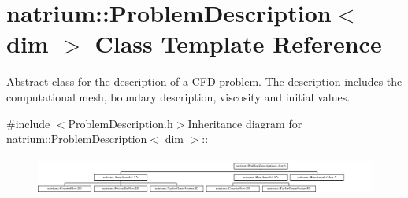 \hypertarget{classnatrium_1_1ProblemDescription}{
\section{natrium::ProblemDescription$<$ dim $>$ Class Template Reference}
\label{classnatrium_1_1ProblemDescription}
}


Abstract class for the description of a CFD problem. The description includes the computational mesh, boundary description, viscosity and initial values.  


{\ttfamily \#include $<$ProblemDescription.h$>$}Inheritance diagram for natrium::ProblemDescription$<$ dim $>$::\begin{figure}[H]
\begin{center}
\leavevmode
\includegraphics[height=1.27273cm]{classnatrium_1_1ProblemDescription}
\end{center}
\end{figure}
